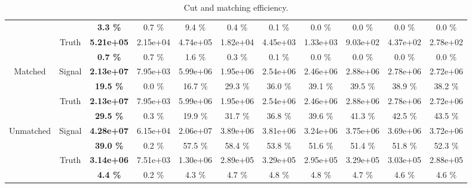 \begin{landscape}
\begin{table}
\begin{tabular}{|c|c|>{\bfseries}c|c|c|c|c|c|c|c|c|}
                                    &                           & 3.3 \%   & 0.7 \%   & 9.4 \%   & 0.4 \%   & 0.1 \%   & 0.0 \%   & 0.0 \%   & 0.0 \%   & 0.0 \%   \\
    \cline{2-11}                                                                                    
                                    & \multirow{2}{*}{Truth}    & 5.21e+05 & 2.15e+04 & 4.74e+05 & 1.82e+04 & 4.45e+03 & 1.33e+03 & 9.03e+02 & 4.37e+02 & 2.78e+02 \\
                                    &                           & 0.7 \%   & 0.7 \%   & 1.6 \%   & 0.3 \%   & 0.1 \%   & 0.0 \%   & 0.0 \%   & 0.0 \%   & 0.0 \%   \\
    \hline                                                              
    \hline                                                              
    \multirow{4}{*}{Matched}        & \multirow{2}{*}{Signal}   & 2.13e+07 & 7.95e+03 & 5.99e+06 & 1.95e+06 & 2.54e+06 & 2.46e+06 & 2.88e+06 & 2.78e+06 & 2.72e+06 \\
                                    &                           & 19.5 \%  & 0.0 \%   & 16.7 \%  & 29.3 \%  & 36.0 \%  & 39.1 \%  & 39.5 \%  & 38.9 \%  & 38.2 \%  \\
    \cline{2-11}                                                                                    
                                    & \multirow{2}{*}{Truth}    & 2.13e+07 & 7.95e+03 & 5.99e+06 & 1.95e+06 & 2.54e+06 & 2.46e+06 & 2.88e+06 & 2.78e+06 & 2.72e+06 \\
                                    &                           & 29.5 \%  & 0.3 \%   & 19.9 \%  & 31.7 \%  & 36.8 \%  & 39.6 \%  & 41.3 \%  & 42.5 \%  & 43.5 \%  \\
    \hline                                                              
    \hline                                                              
    \multirow{4}{*}{Unmatched}      & \multirow{2}{*}{Signal}   & 4.28e+07 & 6.15e+04 & 2.06e+07 & 3.89e+06 & 3.81e+06 & 3.24e+06 & 3.75e+06 & 3.69e+06 & 3.72e+06 \\
                                    &                           & 39.0 \%  & 0.2 \%   & 57.5 \%  & 58.4 \%  & 53.8 \%  & 51.6 \%  & 51.4 \%  & 51.8 \%  & 52.3 \%  \\
    \cline{2-11}                                                                                    
                                    & \multirow{2}{*}{Truth}    & 3.14e+06 & 7.51e+03 & 1.30e+06 & 2.89e+05 & 3.29e+05 & 2.95e+05 & 3.29e+05 & 3.03e+05 & 2.88e+05 \\
                                    &                           & 4.4 \%   & 0.2 \%   & 4.3 \%   & 4.7 \%   & 4.8 \%   & 4.8 \%   & 4.7 \%   & 4.6 \%   & 4.6 \%   \\
    \hline
  \end{tabular}
  \caption{Cut and matching efficiency.}
  \label{tab:CutAndMatchingEfficiency}
\end{table} 
\end{landscape}
